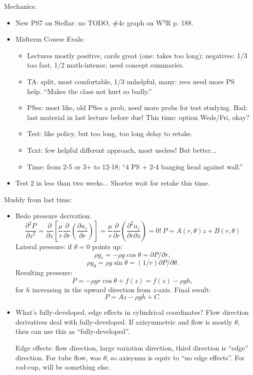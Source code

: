 \documentclass{report}
\begin{document}
Mechanics:
\begin{itemize}
\item New PS7 on Stellar: no TODO, \#4c graph on W$^3$R p. 188.
\item Midterm Course Evals:
  \begin{itemize}
  \item Lectures mostly positive, cards great (one: takes too long); negatives:
    1/3 too fast, 1/2 math-intense; need concept summaries.
  \item TA: split, most comfortable, 1/3 unhelpful, many: recs need more PS
    help.  ``Makes the class not hurt so badly.''
  \item PSes: most like, old PSes a prob, need more probs for test studying.
    Bad: last material in last lecture before due!  This time: option Weds/Fri,
    okay?
  \item Test: like policy, but too long, too long delay to retake.
  \item Text: few helpful different approach, most useless!  But better...
  \item Time: from 2-5 or 3+ to 12-18; ``4 PS + 2-4 banging head against
    wall.''
  \end{itemize}
\item Test 2 in less than two weeks...  Shorter wait for retake this time.
\end{itemize}

\noindent Muddy from last time:
\begin{itemize}
\item Redo pressure derivation.
  $$\frac{\partial^2P}{\partial z^2} = \frac{\partial}{\partial z}
  \left[\frac{\mu}{r}\frac{\partial}{\partial r}
    \left(\frac{\partial u_z}{\partial r}\right)\right] =
  \frac{\mu}{r}\frac{\partial}{\partial r}
  \left(\frac{\partial^2 u_z}{\partial r\partial z}\right) = 0!\ P=
  A(r,\theta)z + B(r,\theta)$$
  Lateral pressure: if $\theta=0$ points up:
  $$\rho g_r=-\rho g\cos\theta=\partial P/\partial r,$$
  $$\rho g_\theta=\rho g\sin\theta = (1/r)\partial P/\partial\theta.$$
  Resulting pressure:
  $$P = - \rho gr\cos\theta + f(z) = f(z) - \rho gh,$$
  for $h$ increasing in the upward direction from $z$-axis.  Final result:
  $$P = Az - \rho gh + C.$$

\item What's fully-developed, edge effects in cylindrical coordinates?  Flow
  direction derivatives deal with fully-developed.  If axisymmetric and flow is
  mostly $\theta$, then can use this as ``fully-developed''.

  Edge effects: flow direction, large variation direction, third direction is
  ``edge'' direction.  For tube flow, was $\theta$, so axisymm is equiv to ``no
  edge effects''.  For rod-cup, will be something else.
\end{itemize}
\end{document}

